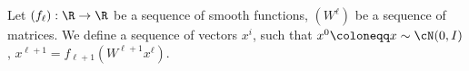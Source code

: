 Let \((f_{\ell}): \R \to \R\) be a sequence of smooth functions, 
    \((W^{\ell})\) be a sequence of matrices.
    We define a sequence of vectors \(x^i\), such that \(x^0 \coloneqq x \sim \cN(0, I)\), 
    \(x^{\ell + 1} = f_{\ell + 1}(W^{\ell + 1} x^{\ell}).\)
